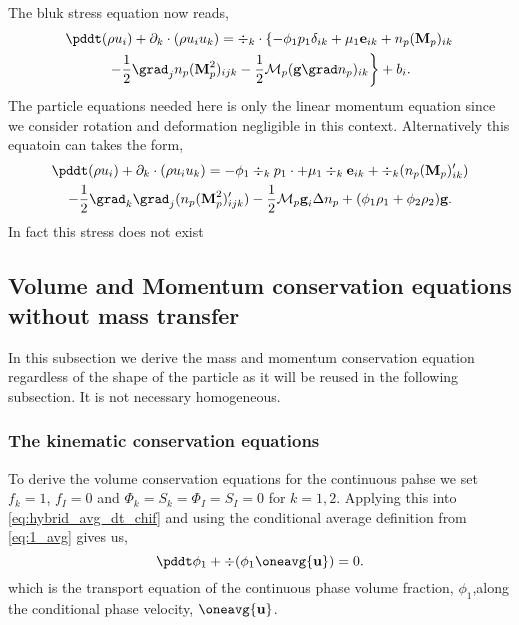 The bluk stress equation now reads, 
\begin{multline}
    \pddt (\rho u_i)
    + \partial_k \cdot (\rho u_i u_k)
    = 
    \div_k\cdot
    \left\{
    - \phi_1 p_1 \delta_{ik} 
    + \mu_1 \textbf{e}_{ik}
    + n_p (\textbf{M}_p)_{ik}
    \right. \\ \left. 
    - \frac{1}{2}\grad_j n_p (\textbf{M}_p^2)_{ijk}
    - \frac{1}{2}\mathcal{M}_p  (\textbf{g} \grad n_p)_{ik}    
    \right\}
    + b_i. 
\end{multline}
The particle equations needed here is only the linear momentum equation since we consider rotation and deformation  negligible in this context. 
Alternatively this equatoin can takes the form, 
\begin{multline}
    \pddt (\rho u_i)
    + \partial_k \cdot (\rho u_i u_k)
    = 
    - \phi_1 \div_k p_1\cdot
    + \mu_1 \div_k \textbf{e}_{ik}
    + \div_k (n_p (\textbf{M}_p )'_{ik})\\
    - \frac{1}{2}\grad_k\grad_j (n_p (\textbf{M}_p^2)'_{ijk})
    - \frac{1}{2}\mathcal{M}_p  \textbf{g}_i \Delta n_p 
    + (\phi_1 \rho_1 + \phi_2 \rho_2 )\textbf{g}. 
\end{multline}
In fact this stress does not exist
\subsection{Volume and Momentum conservation equations without mass transfer}

In this subsection we derive the mass and momentum conservation equation regardless of the shape of the particle as it will be reused in the following subsection. 
It is not necessary homogeneous. 
\subsubsection{The kinematic conservation equations}

To derive the volume conservation equations for the continuous pahse we set $f_{k} = 1$, $f_I = 0$ and  $\Phi_{k} = S_{k} =\Phi_{I} = S_{I} = 0$ for $k=1,2$. 
Applying this into \ref{eq:hybrid_avg_dt_chif} and using the conditional average definition from \ref{eq:1_avg} gives us,
\begin{equation}
    \pddt \phi_1
    + \div (\phi_1 \oneavg{\textbf{u}})
    = 0.
    \label{eq:hybrid_avg_dt_chi}
\end{equation}
which is the transport equation of the continuous phase volume fraction, $\phi_1$,along the conditional phase velocity, $\oneavg{\textbf{u}}$. 


